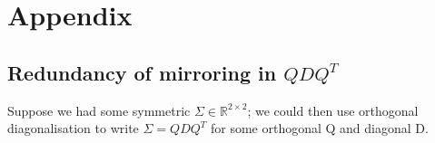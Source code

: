 \documentclass[a4paper, 12pt]{report}
\begin{document}

{\footnotesize }

\newpage
\chapter{Appendix}
\section{Redundancy of mirroring in $QDQ^T$}
\label{sec:red-mirr}
Suppose we had some symmetric $\Sigma \in \mathbb{R}^{2\times 2}$; we could then use orthogonal diagonalisation to write $\Sigma = QDQ^T$ for some orthogonal Q and diagonal D.
\end{document}
